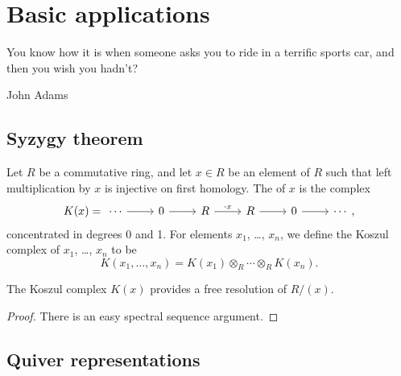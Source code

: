 \documentclass[main.tex]{subfiles}
\begin{document}
\chapter{Basic applications}
\label{ch:basic_applications}

\epigraph{You know how it is when someone asks you to ride in a terrific sports car, and then you wish you hadn't?}{John Adams}

\section{Syzygy theorem}
\label{sec:syzygy_theorem}

\begin{definition}
  \label{def:koszul_complex}
  Let $R$ be a commutative ring, and let $x \in R$ be an element of $R$ such that left multiplication by $x$ is injective on first homology. The  of $x$ is the complex
  \begin{equation*}
    K(x) =
    \begin{tikzcd}
      \cdots
      \arrow[r]
      & 0
      \arrow[r]
      & R
      \arrow[r, "\cdot x"]
      & R
      \arrow[r]
      & 0
      \arrow[r]
      & \cdots
    \end{tikzcd},
  \end{equation*}
  concentrated in degrees 0 and 1. For elements $x_{1}$, \dots, $x_{n}$, we define the Koszul complex of $x_{1}$, \dots, $x_{n}$ to be
  \begin{equation*}
    K(x_{1}, \ldots, x_{n}) = K(x_{1}) \otimes_{R} \cdots \otimes_{R} K(x_{n}).
  \end{equation*}
\end{definition}

\begin{lemma}
  \label{lemma:koszul_complex_free_resolution_in_one_step}
  The Koszul complex $K(x)$ provides a free resolution of $R/(x)$.
\end{lemma}
\begin{proof}
  There is an easy spectral sequence argument.
\end{proof}

\section{Quiver representations}
\label{sec:quiver_representations}
\end{document}
